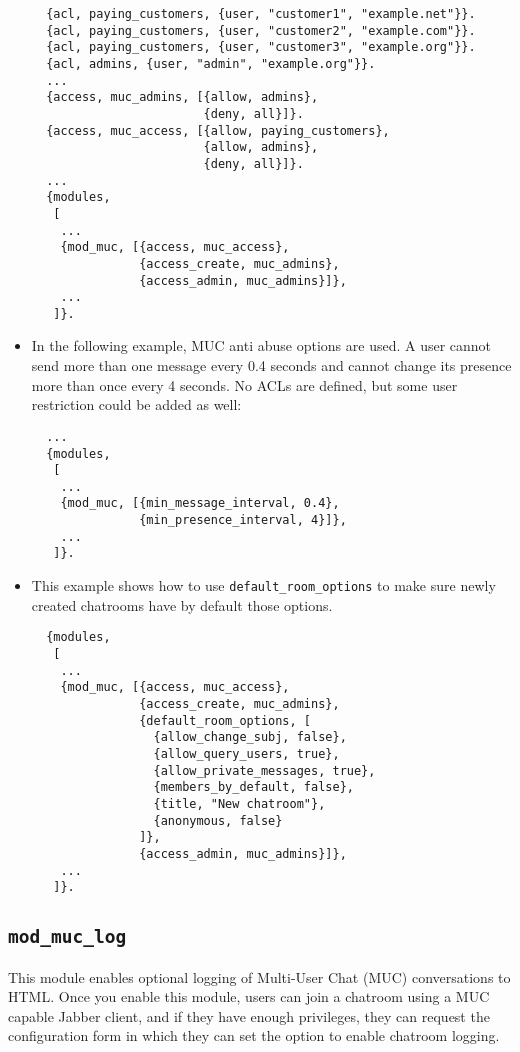 \documentclass[a4paper,10pt]{book}
\newcommand{\ind}[1]{\begin{latexonly}\index{#1}\end{latexonly}}
\newcommand{\option}[1]{\texttt{#1}}
\newcommand{\module}[1]{\texttt{#1}}
\newcommand{\modmuclog}{\module{mod\_muc\_log}}
\begin{document}
\begin{itemize}
  \begin{verbatim}
  {acl, paying_customers, {user, "customer1", "example.net"}}.
  {acl, paying_customers, {user, "customer2", "example.com"}}.
  {acl, paying_customers, {user, "customer3", "example.org"}}.
  {acl, admins, {user, "admin", "example.org"}}.
  ...
  {access, muc_admins, [{allow, admins},
                        {deny, all}]}.
  {access, muc_access, [{allow, paying_customers},
                        {allow, admins},
                        {deny, all}]}.
  ...
  {modules,
   [
    ...
    {mod_muc, [{access, muc_access},
               {access_create, muc_admins},
               {access_admin, muc_admins}]},
    ...
   ]}.
\end{verbatim}

\item In the following example, MUC anti abuse options are used. A
user cannot send more than one message every 0.4 seconds and cannot
change its presence more than once every 4 seconds. No ACLs are
defined, but some user restriction could be added as well:

  \begin{verbatim}
  ...
  {modules,
   [
    ...
    {mod_muc, [{min_message_interval, 0.4},
               {min_presence_interval, 4}]},
    ...
   ]}.
\end{verbatim}

\item This example shows how to use \option{default\_room\_options} to make sure
  newly created chatrooms have by default those options.
  \begin{verbatim}
  {modules,
   [
    ...
    {mod_muc, [{access, muc_access},
               {access_create, muc_admins},
               {default_room_options, [
                 {allow_change_subj, false},
                 {allow_query_users, true},
                 {allow_private_messages, true},
                 {members_by_default, false},
                 {title, "New chatroom"},
                 {anonymous, false}
               ]},
               {access_admin, muc_admins}]},
    ...
   ]}.
\end{verbatim}
\end{itemize}

\subsection{\modmuclog{}}
\label{modmuclog}
\ind{modules!\modmuclog{}}

This module enables optional logging of Multi-User Chat (MUC) conversations to
HTML. Once you enable this module, users can join a chatroom using a MUC capable
Jabber client, and if they have enough privileges, they can request the
configuration form in which they can set the option to enable chatroom logging.
\end{document}
